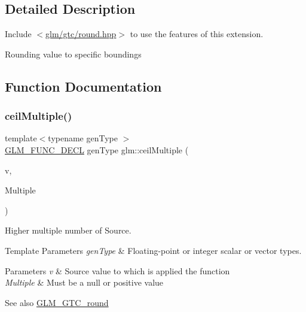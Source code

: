 \subsection{Detailed Description}
Include $<$\hyperlink{round_8hpp}{glm/gtc/round.\+hpp}$>$ to use the features of this extension.

Rounding value to specific boundings 

\subsection{Function Documentation}
\mbox{\label{group__gtc__round_ga1d89ac88582aaf4d5dfa5feb4a376fd4}} 
\subsubsection{\texorpdfstring{ceil\+Multiple()}{ceilMultiple()}\hspace{0.1cm}{\footnotesize\ttfamily [1/2]}}
{\footnotesize\ttfamily template$<$typename gen\+Type $>$ \\
\hyperlink{setup_8hpp_ab2d052de21a70539923e9bcbf6e83a51}{G\+L\+M\+\_\+\+F\+U\+N\+C\+\_\+\+D\+E\+CL} gen\+Type glm\+::ceil\+Multiple (\begin{DoxyParamCaption}\item[{gen\+Type}]{v,  }\item[{gen\+Type}]{Multiple }\end{DoxyParamCaption})}

Higher multiple number of Source.


\begin{DoxyTemplParams}{Template Parameters}
{\em gen\+Type} & Floating-\/point or integer scalar or vector types.\\
\hline
\end{DoxyTemplParams}

\begin{DoxyParams}{Parameters}
{\em v} & Source value to which is applied the function \\
\hline
{\em Multiple} & Must be a null or positive value\\
\hline
\end{DoxyParams}
\begin{DoxySeeAlso}{See also}
\hyperlink{group__gtc__round}{G\+L\+M\+\_\+\+G\+T\+C\+\_\+round} 
\end{DoxySeeAlso}
\mbox{\label{group__gtc__round_gab77fdcc13f8e92d2e0b1b7d7aeab8e9d}} 
